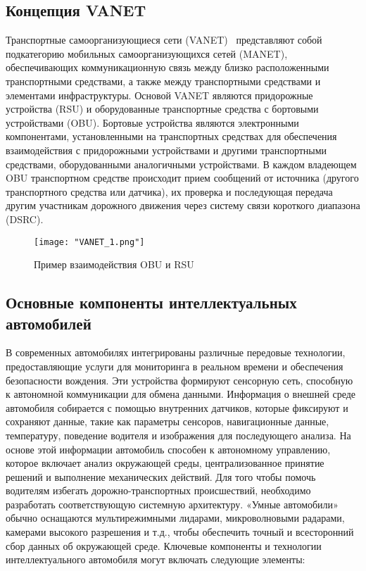 \subsection*{Концепция VANET}

Транспортные самоорганизующиеся сети (VANET)~\cite{anwer2014survey} представляют собой подкатегорию мобильных самоорганизующихся сетей (MANET), обеспечивающих коммуникационную связь между близко расположенными транспортными средствами, а также между транспортными средствами и элементами инфраструктуры. Основой VANET являются придорожные устройства (RSU) и оборудованные транспортные средства с бортовыми устройствами (OBU). Бортовые устройства являются электронными компонентами, установленными на транспортных средствах для обеспечения взаимодействия с придорожными устройствами и другими транспортными средствами, оборудованными аналогичными устройствами. В каждом владеющем OBU транспортном средстве происходит прием сообщений от источника (другого транспортного средства или датчика), их проверка и последующая передача другим участникам дорожного движения через систему связи короткого диапазона (DSRC).

\begin{figure}[!h]
    \centering
    \texttt{[image: "VANET\_1.png"]}
    \caption{Пример взаимодействия OBU и RSU}
    \label{fig:vanet}
\end{figure}

\subsection*{Основные компоненты интеллектуальных автомобилей}

В современных автомобилях интегрированы различные передовые технологии, предоставляющие услуги для мониторинга в реальном времени и обеспечения безопасности вождения. Эти устройства формируют сенсорную сеть, способную к автономной коммуникации для обмена данными.
Информация о внешней среде автомобиля собирается с помощью внутренних датчиков, которые фиксируют и сохраняют данные, такие как параметры сенсоров, навигационные данные, температуру, поведение водителя и изображения для последующего анализа. На основе этой информации автомобиль способен к автономному управлению, которое включает анализ окружающей среды, централизованное принятие решений и выполнение механических действий. Для того чтобы помочь водителям избегать дорожно-транспортных происшествий, необходимо разработать соответствующую системную архитектуру. «Умные автомобили» обычно оснащаются мультирежимными лидарами, микроволновыми радарами, камерами высокого разрешения и т.д., чтобы обеспечить точный и всесторонний сбор данных об окружающей среде. Ключевые компоненты и технологии интеллектуального автомобиля могут включать следующие элементы:

